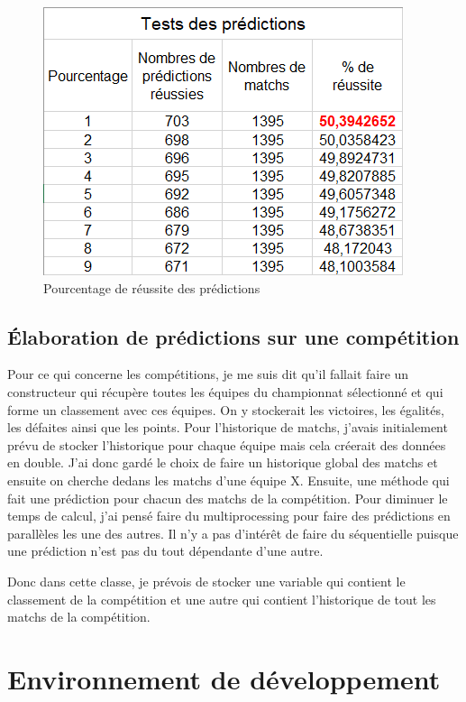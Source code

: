 \documentclass[a4paper,14pt]{extarticle}
\begin{document}
{\begin{figure}[htp]
    \centering
    \includegraphics{../img/pourcentReussitePredictionV3.png}
    \caption{Pourcentage de réussite des prédictions}
    \label{fig:pourcentReussite}
\end{figure}

\subsection{Élaboration de prédictions sur une compétition}
\label{predictionCompetition}
Pour ce qui concerne les compétitions, je me suis dit qu'il fallait faire un constructeur qui récupère toutes les équipes du championnat sélectionné et qui forme un classement avec ces équipes. On y stockerait les victoires, les égalités, les défaites ainsi que les points. Pour l'historique de matchs, j'avais initialement prévu de stocker l'historique pour chaque équipe mais cela créerait des données en double. J'ai donc gardé le choix de faire un historique global des matchs et ensuite on cherche dedans les matchs d'une équipe X. 
Ensuite, une méthode qui fait une prédiction pour chacun des matchs de la compétition. Pour diminuer le temps de calcul, j'ai pensé faire du multiprocessing pour faire des prédictions en parallèles les une des autres. Il n'y a pas d'intérêt de faire du séquentielle puisque une prédiction n'est pas du tout dépendante d'une autre.

Donc dans cette classe, je prévois de stocker une variable qui contient le classement de la compétition et une autre qui contient l'historique de tout les matchs de la compétition.



\newpage

\section{Environnement de développement}

}
\end{document}
